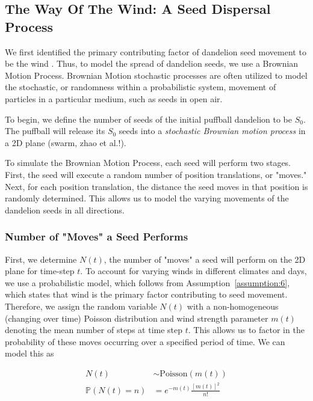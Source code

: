 \subsection{The Way Of The Wind: A Seed Dispersal Process}

We first identified the primary contributing factor of dandelion seed movement to be the wind \cite{wang_separating_2021}. Thus, to model the spread of dandelion seeds, we use a Brownian Motion Process. Brownian Motion stochastic processes are often utilized to model the stochastic, or randomness within a probabilistic system, movement of particles in a particular medium, such as seeds in open air.

To begin, we define the number of seeds of the initial puffball dandelion to be \(S_0\). The puffball will release its \(S_0\) seeds into a \textit{stochastic Brownian motion process} in a 2D plane (swarm, zhao et al.!). 

To simulate the Brownian Motion Process, each seed will perform two stages. First, the seed will execute a random number of position translations, or "moves."  Next, for each position translation, the distance the seed moves in that position is randomly determined. This allows us to model the varying movements of the dandelion seeds in all directions.

\subsubsection{Number of "Moves" a Seed Performs}
    First, we determine \(N(t)\), the number of "moves" a seed will perform on the 2D plane for time-step \(t\). To account for varying winds in different climates and days, we use a probabilistic model, which follows from Assumption~\ref{assumption:6}, which states that wind is the primary factor contributing to seed movement. Therefore, we assign the random variable \(N(t)\) with a non-homogeneous (changing over time) Poisson distribution and wind strength parameter \(m(t)\) denoting the mean number of steps at time step \(t\). This allows us to factor in the probability of these moves occurring over a specified period of time. We can model this as 

    \begin{align}
        N(t) & \sim \text{Poisson}(m(t)) \\
        \mathbb{P}(N(t)=n) & = e^{-m(t)}\frac{\left[m(t)\right]^2}{n!} \nonumber
    \end{align}


